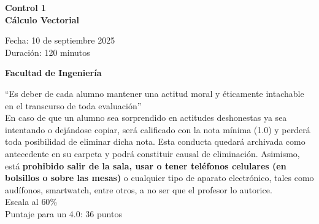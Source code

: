 \documentclass[a4paper]{article}
\begin{document}
\thispagestyle{fancy}
\vspace*{1cm}

\begin{minipage}[r]{12cm}
    \begin{flushright}
    \end{flushright}
\end{minipage}

\begin{center}
\Large{\textbf{Control 1\\ Cálculo Vectorial\\ }}
\end{center}
\vspace{1cm}
\begin{minipage}[r]{15cm}
\begin{flushleft}

Fecha: 10 de septiembre 2025 \\%
Duración: 120 minutos  \\

\end{flushleft}
\end{minipage}
\vspace{2cm}
\begin{center}
\Large{\textbf{Facultad de Ingeniería}}
\end{center}
\vspace{1cm}
\setlength{\parindent}{0cm}
“Es deber de cada alumno mantener una actitud moral y éticamente intachable en el transcurso de toda evaluación” \\

En caso de que un alumno sea sorprendido en actitudes deshonestas ya sea intentando o
dejándose copiar, será calificado con la nota mínima (1.0) y perderá toda posibilidad de
eliminar dicha nota. Esta conducta quedará archivada como antecedente en su carpeta y podrá
constituir causal de eliminación. Asimismo, está \textbf{prohibido salir de la sala, usar o tener
teléfonos celulares (en bolsillos o sobre las mesas)} o cualquier tipo de aparato electrónico,
tales como audífonos, smartwatch, entre otros, a no ser que el profesor lo autorice.\\


Escala al $60\%$ \\

Puntaje para un 4.0: 36 puntos


\vspace{3cm}
\newpage
\thispagestyle{empty}
\end{document}
